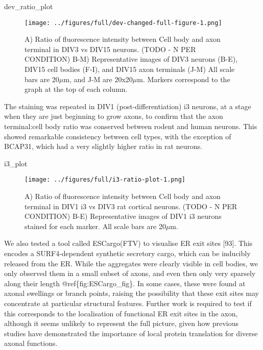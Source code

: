 \documentclass[
  12pt,
  a4paper,
]{book}
\newenvironment{Shaded}{\begin{snugshade}}{\end{snugshade}}
\newcommand{\NormalTok}[1]{#1}
\begin{document}
\begin{Shaded}
\begin{Highlighting}[]
\NormalTok{dev\_ratio\_plot}
\end{Highlighting}
\end{Shaded}

\begin{figure}
\centering
\texttt{[image: ../figures/full/dev-changed-full-figure-1.png]}
\caption{\label{fig:dev-changed-full-figure}A) Ratio of fluorescence intensity between Cell body and axon terminal in DIV3 vs DIV15 neurons. (TODO - N PER CONDITION) B-M) Representative images of DIV3 neurons (B-E), DIV15 cell bodies (F-I), and DIV15 axon terminals (J-M) All scale bars are 20\(\mu\)m, and J-M are 20x20\(\mu\)m. Markers correspond to the graph at the top of each column.}
\end{figure}

The staining was repeated in DIV1 (post-differentiation) i3 neurons, at a stage when they are just beginning to grow axons, to confirm that the axon terminal:cell body ratio was conserved between rodent and human neurons. This showed remarkable consistency between cell types, with the exception of BCAP31, which had a very slightly higher ratio in rat neurons.

\begin{Shaded}
\begin{Highlighting}[]
\NormalTok{i3\_plot}
\end{Highlighting}
\end{Shaded}

\begin{figure}
\centering
\texttt{[image: ../figures/full/i3-ratio-plot-1.png]}
\caption{\label{fig:i3-ratio-plot}A) Ratio of fluorescence intensity between Cell body and axon terminal in DIV1 i3 vs DIV3 rat cortical neurons. (TODO - N PER CONDITION) B-E) Representative images of DIV1 i3 neurons stained for each marker. All scale bars are 20\(\mu\)m.}
\end{figure}

We also tested a tool called ESCargo(FTV) to visualise ER exit sites {[}93{]}. This encodes a SURF4-dependent synthetic secretory cargo, which can be inducibly released from the ER. While the aggregates were clearly visible in cell bodies, we only observed them in a small subset of axons, and even then only very sparsely along their length @ref\{fig:ESCargo\_fig\}. In some cases, these were found at axonal swellings or branch points, raising the possibility that these exit sites may concentrate at particular structural features. Further work is required to test if this corresponds to the localisation of functional ER exit sites in the axon, although it seems unlikely to represent the full picture, given how previous studies have demonstrated the importance of local protein translation for diverse axonal functions.
\end{document}
